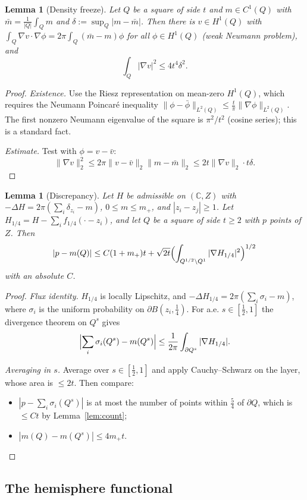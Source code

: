 \documentclass[11pt]{article}
\newtheorem{lemma}[theorem]{Lemma}
\theoremstyle{definition}
\theoremstyle{remark}
\newcommand{\C}{\mathbb C}
\begin{document}
\begin{lemma}[Density freeze]\label{lem:freeze}
Let $Q$ be a square of side $t$ and $m\in C^1(Q)$ with $\bar m=\frac1{|Q|}\int_Qm$ and
$\delta:=\sup_Q|m-\bar m|$. Then there is $v\in H^1(Q)$ with $\int_Q\nabla v\cdot\nabla\phi=2\pi\int_Q(\bar m-m)\phi$ for all
$\phi\in H^1(Q)$ (weak Neumann problem), and
\[
\int_Q|\nabla v|^2\le4t^4\delta^2 .
\]
\end{lemma}
\begin{proof}
\emph{Existence.} Use the Riesz representation on mean-zero $H^1(Q)$, which requires the Neumann
Poincaré inequality $\|\phi-\bar\phi\|_{L^2(Q)}\le\frac t\pi\|\nabla\phi\|_{L^2(Q)}$. The first
nonzero Neumann eigenvalue of the square is $\pi^2/t^2$ (cosine series); this is a standard fact.

\emph{Estimate.} Test with $\phi=v-\bar v$:
\[
\|\nabla v\|_2^2\le2\pi\|v-\bar v\|_2\|m-\bar m\|_2\le2t\|\nabla v\|_2\cdot t\delta .
\]
\end{proof}

\begin{lemma}[Discrepancy]\label{lem:discrepancy}
Let $H$ be admissible on $(\C,Z)$ with $-\Delta H=2\pi(\sum_i\delta_{z_i}-m)$, $0\le m\le m_+$, and
$|z_i-z_j|\ge1$. Let $H_{1/4}=H-\sum_if_{1/4}(\cdot-z_i)$, and let $Q$ be a square of side
$t\ge2$ with $p$ points of $Z$. Then
\[
|p-m(Q)|\le C(1+m_+)t+\sqrt{2t}\Bigl(\int_{Q^{1/2}\setminus Q^{1}}|\nabla H_{1/4}|^2\Bigr)^{1/2}
\]
with an absolute $C$.
\end{lemma}
\begin{proof}
\emph{Flux identity.} $H_{1/4}$ is locally Lipschitz, and
$-\Delta H_{1/4}=2\pi(\sum_i\sigma_i-m)$, where $\sigma_i$ is the uniform probability on
$\partial B(z_i,\tfrac14)$. For a.e. $s\in[\tfrac12,1]$ the divergence theorem on $Q^s$ gives
\[
\Bigl|\sum_i\sigma_i(Q^s)-m(Q^s)\Bigr|\le\frac1{2\pi}\int_{\partial Q^s}|\nabla H_{1/4}| .
\]

\emph{Averaging in $s$.} Average over $s\in[\frac12,1]$ and apply Cauchy--Schwarz on the layer,
whose area is $\le2t$. Then compare:
\begin{itemize}[leftmargin=*]
\item $|p-\sum_i\sigma_i(Q^s)|$ is at most the number of points within $\tfrac54$ of
  $\partial Q$, which is $\le Ct$ by Lemma~\ref{lem:count};
\item $|m(Q)-m(Q^s)|\le4m_+t$.\qedhere
\end{itemize}
\end{proof}

\subsection{The hemisphere functional}
\end{document}
